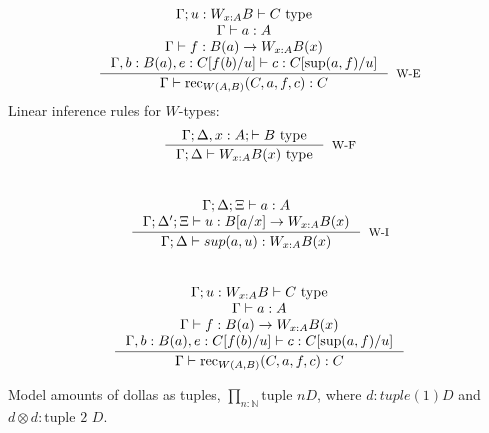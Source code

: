 \[
\begin{split}
  \inference{\Gamma; u : W_{x :A}B \vdash C \text{ type}\\
    \Gamma \vdash a : A\\
    \Gamma \vdash f : B(a) \to W_{x : A}B(x)\\
    \Gamma, b : B(a), e : C[f(b)/u] \vdash c : C[\text{sup}(a,f)/u]
  }
            {\Gamma \vdash \text{rec}_{W(A, B)}(C,a,f,c) : C
            }[W-E]
\end{split}
\]
Linear inference rules for $W$-types:
\[
\inference{\Gamma; \Delta, x : A; \vdash B \text{ type}}
{\Gamma; \Delta \vdash W_{x : A}B(x) \text{ type}}[W-F]
\]\\
\[
\begin{split}
  \inference{\Gamma; \Delta; \Xi \vdash a : A\\
    \Gamma; \Delta'; \Xi \vdash u : B[a/x] \to W_{x : A}B(x)}
    {\Gamma; \Delta \vdash sup(a, u) : W_{x : A}B(x)}[W-I]
\end{split}
\]\\
\[
\begin{split}
  \inference{\Gamma; u : W_{x :A}B \vdash C \text{ type}\\
    \Gamma \vdash a : A\\
    \Gamma \vdash f : B(a) \to W_{x : A}B(x)\\
    \Gamma, b : B(a), e : C[f(b)/u] \vdash c : C[\text{sup}(a,f)/u]
  }
            {\Gamma \vdash \text{rec}_{W(A, B)}(C,a,f,c) : C
            }
\end{split}
\]

Model amounts of dollas as tuples, $\prod_{n : \mathbb{N}}\text{tuple } n D$, where $d : tuple (1) D$ and $d \otimes d : \text{tuple 2 } D$.
